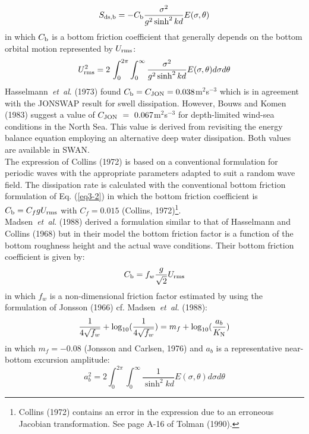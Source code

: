 \documentclass[12pt]{book}
\begin{document}
\begin{equation}
  S_{\rm ds,b} = -C_{\rm b} \frac{\sigma^2}{g^2 \sinh^2 kd} E (\sigma,\theta)
  \label{eq3-17}
\end{equation}
in which $C_{\rm b}$ is a bottom friction coefficient that generally depends on the bottom orbital motion
represented by $U_{\rm rms}$:
\begin{equation}
  U^2_{\rm rms} = 2\,\int_{0}^{2\pi} \int_{0}^{\infty} \frac{\sigma^2}{g^2 \sinh^2 kd} E(\sigma,\theta) d\sigma d\theta
  \label{eq3-18}
\end{equation}
Hasselmann~{\it et~al}. (1973) found $C_{\rm b}=C_{\rm JON}=0.038$m$^{2}$s$^{-3}$ which is in
agreement with the JONSWAP result for swell dissipation. However, Bouws and Komen (1983) suggest a
value of $C_{\rm JON}~=~0.067$m$^{2}$s$^{-3}$ for depth-limited wind-sea conditions in the North Sea. This value is derived
from revisiting the energy balance equation employing an alternative deep water dissipation.
Both values are available in SWAN.
\\[2ex]
\noindent
The expression of Collins (1972) is based on a conventional formulation for periodic waves with the
appropriate parameters adapted to suit a random wave field. The dissipation rate is calculated with the
conventional bottom friction formulation of Eq. (\ref{eq3-2}) in which the bottom friction coefficient is
$C_{\rm b} = C_f g U_{\rm rms}$ with $C_f = 0.015$ (Collins, 1972)\footnote{Collins (1972) contains
an error in the expression due to an erroneous Jacobian transformation. See page A-16 of Tolman (1990).}.
\\[2ex]
\noindent
Madsen~{\it et~al}. (1988) derived a formulation similar to that of Hasselmann and Collins (1968) but in their
model the bottom friction factor is a function of the bottom roughness height and the actual wave
conditions. Their bottom friction coefficient is given by:
\begin{equation}
  C_{\rm b} = f_w \frac{g}{\sqrt{2}} U_{\rm rms}
  \label{eq3-19}
\end{equation}
in which $f_w$ is a non-dimensional friction factor estimated by using the formulation of Jonsson (1966) cf.
Madsen~{\it et~al}. (1988):
\begin{equation}
  \frac{1}{4\sqrt{f_w}} + \log_{10} (\frac{1}{4\sqrt{f_w}}) = m_f + \log_{10} (\frac{a_b}{K_{\rm N}})
  \label{eq3-20}
\end{equation}
in which $m_f = -0.08$ (Jonsson and Carlsen, 1976) and $a_b$ is a representative near-bottom excursion
amplitude:
\begin{equation}
  a^2_{b} = 2\int_{0}^{2\pi} \int_{0}^{\infty} \frac{1}{\sinh^2 kd} E(\sigma,\theta) d\sigma d\theta
  \label{eq3-21}
\end{equation}
\end{document}
